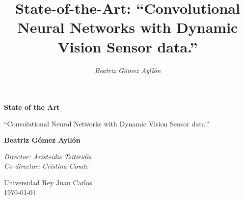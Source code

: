 \documentclass[12pt,a4paper,titlepage,twoside]{book}
\title{\Huge \textbf{State-of-the-Art: ``Convolutional Neural Networks with Dynamic Vision Sensor data.''}}
\author{\Huge \textit{Beatriz Gómez Ayllón}}
\newcommand{\blankpage}{
\newpage \thispagestyle{empty}
\emph{  }
\newpage
}
\begin{document}
 

\mtcaddchapter %

\frontmatter
\marginsize{3.0cm}{2.0cm}{3.5cm}{2.5cm}


%




%




\begin{titlepage}
    \begin{center}
        \vspace*{1cm}
        
        \Huge \textbf{State of the Art}
        
        \vspace{0.5cm}
        \Huge ``Convolutional Neural Networks with Dynamic Vision Sensor data.''
        
        \vspace{1.5cm}
        
        \Large \textbf{Beatriz Gómez Ayllón}
        
        \vspace{2cm}
        
       \Large \textit{Director: Aristeidis Tsitiridis\\
       Co-director: Cristina Conde}
        

       \vspace{5cm}

       	Universidad Rey Juan Carlos\\
        \today

        \vfill
             
        
        
    \end{center}
\end{titlepage}





\blankpage %
\end{document}
